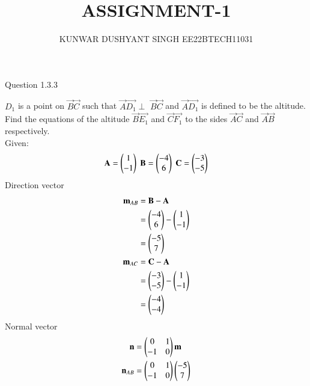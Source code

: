 \documentclass[journal,12pt,twocolumn]{IEEEtran}
\theoremstyle{remark}
\begin{document}



\vspace{3cm}

\title{
ASSIGNMENT-1
}
\author{ KUNWAR DUSHYANT SINGH EE22BTECH11031}


\maketitle

\newpage


\bigskip

\renewcommand{\thefigure}{\theenumi}
\renewcommand{\thetable}{\theenumi}

Question 1.3.3 

$D_{1}$ is a point on $\vec{B}$$\vec{C}$ such that
$\vec{A}$$\vec{D_{1}}$$\perp$ $\vec{B}$$\vec{C}$ and $\vec{A}$$\vec{D_{1}}$  is defined to be the altitude.
Find the equations of the altitude $\vec{B}$$\vec{E_{1}}$ and $\vec{C}$$\vec{F_{1}}$
to the sides $\vec{A}$$\vec{C}$ and $\vec{A}$$\vec{B}$ respectively.
\\ \solution
Given:
\begin{align}\mathbf{A}=\begin{pmatrix}1\\-1\end{pmatrix} \;
\mathbf{B}=\begin{pmatrix}-4 \\6\end{pmatrix} \;
\mathbf{C}=\begin{pmatrix}-3\\-5\end{pmatrix}
\end{align}
Direction vector 
\begin{align}
\mathbf{m}_{AB}&=\mathbf{B}-\mathbf{A} \\
&=\begin{pmatrix}-4\\6\end{pmatrix}-\begin{pmatrix}1\\-1\end{pmatrix} \\
&=\begin{pmatrix}-5\\7\end{pmatrix} \\
\mathbf{m}_{AC}&=\mathbf{C}-\mathbf{A} \\
&=\begin{pmatrix}-3\\-5\\\end{pmatrix}-\begin{pmatrix}1\\-1\end{pmatrix} \\
&=\begin{pmatrix}-4\\-4\\\end{pmatrix}
\end{align}
Normal vector
\begin{align}
\vec{n}&=\myvec{0&1 \\-1&0}\vec{m} \\
\vec{n}_{AB}&=\myvec{0&1 \\-1&0}\myvec{-5\\7} \\

\end{align}$$
\end{document}
